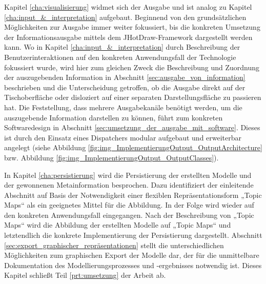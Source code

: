Kapitel \ref{cha:visualisierung} widmet sich der Ausgabe und ist analog zu Kapitel \ref{cha:input_&_interpretation} aufgebaut. Beginnend von den grundsätzlichen Möglichkeiten zur Ausgabe immer weiter fokussiert, bis die konkreten Umsetzung der Informationsausgabe mittels dem JHotDraw-Framework \citep{Gamma96} dargestellt werden kann. Wo in Kapitel \ref{cha:input_&_interpretation} durch Beschreibung der Benutzerinteraktionen auf den konkreten Anwendungsfall der Technologie fokussiert wurde, wird hier zum gleichen Zweck die Beschreibung und Zuordnung der auszugebenden Information in Abschnitt \ref{sec:ausgabe_von_information} beschrieben und die Unterscheidung getroffen, ob die Ausgabe direkt auf der Tischoberfläche oder disloziert auf einer separaten Darstellungsfläche zu passieren hat. Die Feststellung, dass mehrere Ausgabekanäle benötigt werden, um die auszugebende Information darstellen zu können, führt zum konkreten Softwaredesign in Abschnitt \ref{sec:umsetzung_der_ausgabe_mit_software}. Dieses ist durch den Einsatz eines Dispatchers modular aufgebaut und erweiterbar angelegt (siehe Abbildung \ref{fig:img_ImplementierungOutput_OutputArchitecture} bzw. Abbildung \ref{fig:img_ImplementierungOutput_OutputClasses}).

In Kapitel \ref{cha:persistierung} wird die Persistierung der erstellten Modelle und der gewonnenen Metainformation besprochen. Dazu identifiziert der einleitende Abschnitt auf Basis der Notwendigkeit einer flexiblen Repräsentationsform „Topic Maps“ \citep{TMDM08} als ein geeignetes Mittel für die Abbildung. In der Folge wird  wieder auf den konkreten Anwendungsfall eingegangen. Nach der Beschreibung von „Topic Maps“ wird die Abbildung der erstellten Modelle auf „Topic Maps“ und letztendlich die konkrete Implementierung der Persistierung dargestellt. Abschnitt \ref{sec:export_graphischer_repräsentationen} stellt die unterschiedlichen Möglichkeiten zum graphischen Export der Modelle dar, der für die unmittelbare Dokumentation des Modellierungsprozesses und -ergebnisses notwendig ist. Dieses Kapitel schließt Teil \ref{prt:umsetzung} der Arbeit ab.

